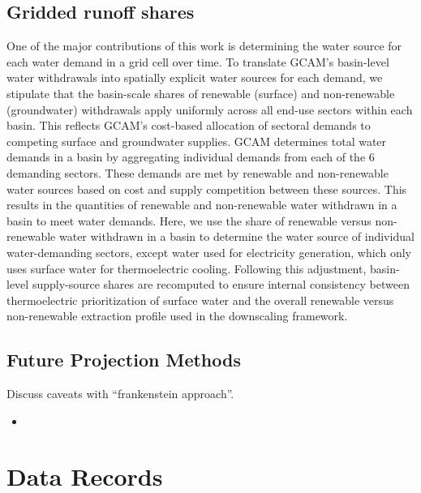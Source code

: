 \documentclass[fleqn,10pt]{wlscirep}
\begin{document}
\subsection{Gridded runoff shares}
One of the major contributions of this work is determining the water source for each water demand in a grid cell over time. To translate GCAM’s basin-level water withdrawals into spatially explicit water sources for each demand, we stipulate that the basin-scale shares of renewable (surface) and non-renewable (groundwater) withdrawals apply uniformly across all end-use sectors within each basin. This reflects GCAM’s cost-based allocation of sectoral demands to competing surface and groundwater supplies. 
GCAM determines total water demands in a basin by aggregating individual demands from each of the 6 demanding sectors. These demands are met by renewable and non-renewable water sources based on cost and supply competition between these sources. This results in the quantities of renewable and non-renewable water withdrawn in a basin to meet water demands. Here, we use the share of renewable versus non-renewable water withdrawn in a basin to determine the water source of individual water-demanding sectors, except water used for electricity generation, which only uses surface water for thermoelectric cooling. 
Following this adjustment, basin-level supply-source shares are recomputed to ensure internal consistency between thermoelectric prioritization of surface water and the overall renewable versus non-renewable extraction profile used in the downscaling framework.


\subsection{Future Projection Methods}
Discuss caveats with ``frankenstein approach''.
\begin{itemize}
    \item 
\end{itemize}

\section*{Data Records}
\end{document}
